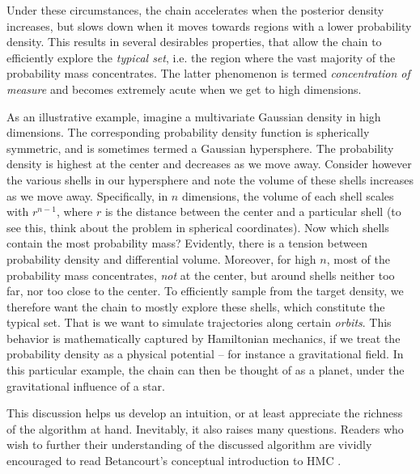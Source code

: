 \documentclass[11pt]{article}
\begin{document}
  Under these circumstances, the chain accelerates when the posterior density increases,
  but slows down when it moves towards regions with a lower probability density.
  This results in several desirables properties, that allow the chain
  to efficiently explore the \textit{typical set}, i.e. the region where the vast majority of the probability
  mass concentrates.
  The latter phenomenon is termed \textit{concentration of measure} and becomes extremely acute
  when we get to high dimensions.
  
  As an illustrative example, imagine a multivariate Gaussian density in high dimensions. 
  The corresponding probability density function is spherically symmetric, and is sometimes termed a Gaussian
  hypersphere.
  The probability density is highest at the center and decreases as we move away.
  Consider however the various shells in our hypersphere and
  note the volume of these shells increases as we move away.
  Specifically, in $n$ dimensions, the volume of each shell scales with $r^{n-1}$, where $r$ is the distance
  between the center and a particular shell (to see this, think about the problem in spherical coordinates).
  Now which shells contain the most probability mass? 
  Evidently, there is a tension between probability density and differential volume. 
  Moreover, for high $n$, most of the probability mass concentrates, \textit{not} at the center,
  but around shells neither too far, nor too close to the center.
  To efficiently sample from the target density, we therefore want the chain to mostly explore these shells,
  which constitute the typical set.
  That is we want to simulate trajectories along certain \textit{orbits}.
  This behavior is mathematically captured by Hamiltonian mechanics, if we treat the probability
  density as a physical potential -- for instance a gravitational field.
  In this particular example,
  the chain can then be thought of as a planet, under the gravitational influence of a star.
  
  This discussion helps us develop an intuition, or at least appreciate the richness of the algorithm at hand.
  Inevitably, it also raises many questions.
  Readers who wish to further their understanding of the discussed algorithm 
  are vividly encouraged to read Betancourt's conceptual introduction to HMC \cite{Betancourt:2017}.
  
  
\end{document}
